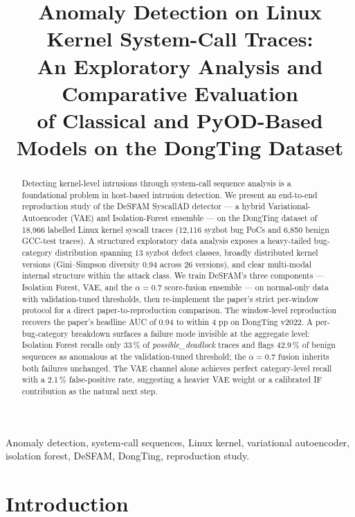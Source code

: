 \documentclass[conference,10pt]{IEEEtran}
\title{Anomaly Detection on Linux Kernel System-Call Traces:\\
       An Exploratory Analysis and Comparative Evaluation\\
       of Classical and PyOD-Based Models on the DongTing Dataset}
\author{
  \IEEEauthorblockN{Author Name}
  \IEEEauthorblockA{
    KMA Cybersecurity Master's Program\\
    Information Security Specialty Project\\
    Email: \texttt{author@example.org}
  }
}
\begin{document}
\maketitle

\begin{abstract}
Detecting kernel-level intrusions through system-call sequence analysis is a
foundational problem in host-based intrusion detection. We present an
end-to-end reproduction study of the DeSFAM SyscallAD detector --- a hybrid
Variational-Autoencoder (VAE) and Isolation-Forest ensemble --- on the
DongTing dataset of 18{,}966 labelled Linux kernel syscall traces
(12{,}116 syzbot bug PoCs and 6{,}850 benign GCC-test traces). A
structured exploratory data analysis exposes a heavy-tailed bug-category
distribution spanning 13 syzbot defect classes, broadly distributed
kernel versions (Gini--Simpson diversity 0.94 across 26 versions), and
clear multi-modal internal structure within the attack class. We train
DeSFAM's three components --- Isolation Forest, VAE, and the
$\alpha = 0.7$ score-fusion ensemble --- on normal-only data with
validation-tuned thresholds, then re-implement the paper's strict
per-window protocol for a direct paper-to-reproduction comparison. The
window-level reproduction recovers the paper's headline AUC of 0.94 to
within 4 pp on DongTing v2022. A per-bug-category breakdown surfaces a
failure mode invisible at the aggregate level: Isolation Forest recalls
only 33\,\% of \emph{possible\_deadlock} traces and flags 42.9\,\% of
benign sequences as anomalous at the validation-tuned threshold; the
$\alpha = 0.7$ fusion inherits both failures unchanged. The VAE channel
alone achieves perfect category-level recall with a 2.1\,\%
false-positive rate, suggesting a heavier VAE weight or a calibrated IF
contribution as the natural next step.
\end{abstract}

\begin{IEEEkeywords}
Anomaly detection, system-call sequences, Linux kernel, variational
autoencoder, isolation forest, DeSFAM, DongTing, reproduction study.
\end{IEEEkeywords}

\section{Introduction}
\label{sec:intro}
\end{document}
